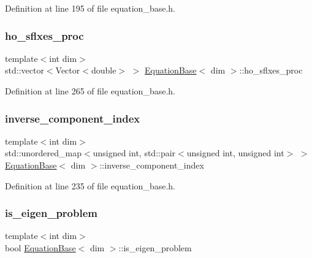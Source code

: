 Definition at line 195 of file equation\+\_\+base.\+h.

\mbox{\label{class_equation_base_a25123cf5f335e267799a52420396a276}} 
\subsubsection{\texorpdfstring{ho\+\_\+sflxes\+\_\+proc}{ho\_sflxes\_proc}}
{\footnotesize\ttfamily template$<$int dim$>$ \\
std\+::vector$<$Vector$<$double$>$ $>$ \hyperlink{class_equation_base}{Equation\+Base}$<$ dim $>$\+::ho\+\_\+sflxes\+\_\+proc\hspace{0.3cm}{\ttfamily [private]}}



Definition at line 265 of file equation\+\_\+base.\+h.

\mbox{\label{class_equation_base_a1d2e520638913dfeb4e16f3a09911836}} 
\subsubsection{\texorpdfstring{inverse\+\_\+component\+\_\+index}{inverse\_component\_index}}
{\footnotesize\ttfamily template$<$int dim$>$ \\
std\+::unordered\+\_\+map$<$unsigned int, std\+::pair$<$unsigned int, unsigned int$>$ $>$ \hyperlink{class_equation_base}{Equation\+Base}$<$ dim $>$\+::inverse\+\_\+component\+\_\+index\hspace{0.3cm}{\ttfamily [protected]}}



Definition at line 235 of file equation\+\_\+base.\+h.

\mbox{\label{class_equation_base_a749f717dadd0df287fd0c366a7a8e0c1}} 
\subsubsection{\texorpdfstring{is\+\_\+eigen\+\_\+problem}{is\_eigen\_problem}}
{\footnotesize\ttfamily template$<$int dim$>$ \\
bool \hyperlink{class_equation_base}{Equation\+Base}$<$ dim $>$\+::is\+\_\+eigen\+\_\+problem\hspace{0.3cm}{\ttfamily [protected]}}



